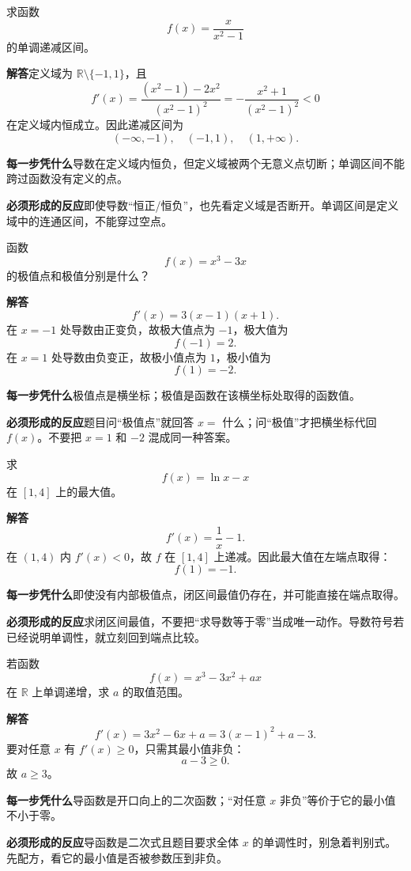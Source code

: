 \documentclass[11pt,fontset=fandol]{ctexart}
\newcommand{\R}{\mathbb R}
\newcommand{\answer}{\par\textbf{解答}\quad}
\newcommand{\basis}{\par\textbf{每一步凭什么}\quad}
\newcommand{\reaction}{\par\textbf{必须形成的反应}\quad}
\newenvironment{drill}[2]{
  \begin{tcolorbox}[colback=white,colframe=black!35,title={#1\quad\small #2},breakable]
}{\end{tcolorbox}}
\begin{document}
\begin{drill}{45. 导数为负的区间要与定义域取交}{项目导数题库改编}
求函数
\[
f(x)=\frac{x}{x^2-1}
\]
的单调递减区间。

\answer 定义域为 $\R\setminus\{-1,1\}$，且
\[
f'(x)=\frac{(x^2-1)-2x^2}{(x^2-1)^2}
=-\frac{x^2+1}{(x^2-1)^2}<0
\]
在定义域内恒成立。因此递减区间为
\[
(-\infty,-1),\quad(-1,1),\quad(1,+\infty).
\]

\basis 导数在定义域内恒负，但定义域被两个无意义点切断；单调区间不能跨过函数没有定义的点。

\reaction 即使导数“恒正/恒负”，也先看定义域是否断开。单调区间是定义域中的连通区间，不能穿过空点。
\end{drill}

\begin{drill}{46. 极值点与极值是两个不同对象}{人教B版导数与极值题型改编}
函数
\[
f(x)=x^3-3x
\]
的极值点和极值分别是什么？

\answer
\[
f'(x)=3(x-1)(x+1).
\]
在 $x=-1$ 处导数由正变负，故极大值点为 $-1$，极大值为
\[
f(-1)=2.
\]
在 $x=1$ 处导数由负变正，故极小值点为 $1$，极小值为
\[
f(1)=-2.
\]

\basis 极值点是横坐标；极值是函数在该横坐标处取得的函数值。

\reaction 题目问“极值点”就回答 $x=$ 什么；问“极值”才把横坐标代回 $f(x)$。不要把 $x=1$ 和 $-2$ 混成同一种答案。
\end{drill}

\begin{drill}{47. 最值题的端点可能就是答案}{人教B版导数与最值题型改编}
求
\[
f(x)=\ln x-x
\]
在 $[1,4]$ 上的最大值。

\answer
\[
f'(x)=\frac1x-1.
\]
在 $(1,4)$ 内 $f'(x)<0$，故 $f$ 在 $[1,4]$ 上递减。因此最大值在左端点取得：
\[
f(1)=-1.
\]

\basis 即使没有内部极值点，闭区间最值仍存在，并可能直接在端点取得。

\reaction 求闭区间最值，不要把“求导数等于零”当成唯一动作。导数符号若已经说明单调性，就立刻回到端点比较。
\end{drill}

\begin{drill}{48. 参数出现在线性项时，导数常可转成二次函数最值}{项目导数题库改编}
若函数
\[
f(x)=x^3-3x^2+ax
\]
在 $\R$ 上单调递增，求 $a$ 的取值范围。

\answer
\[
f'(x)=3x^2-6x+a=3(x-1)^2+a-3.
\]
要对任意 $x$ 有 $f'(x)\ge0$，只需其最小值非负：
\[
a-3\ge0.
\]
故 $a\ge3$。

\basis 导函数是开口向上的二次函数；“对任意 $x$ 非负”等价于它的最小值不小于零。

\reaction 导函数是二次式且题目要求全体 $x$ 的单调性时，别急着判别式。先配方，看它的最小值是否被参数压到非负。
\end{drill}
\end{document}
